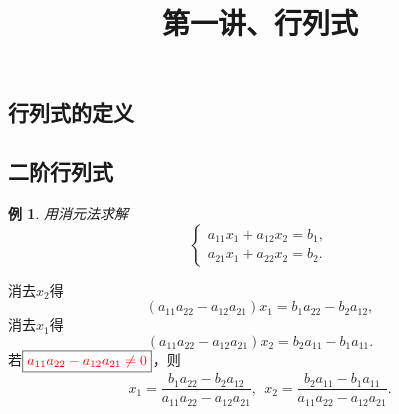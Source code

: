 \documentclass[10pt,a4paper%
tablecaptionabove]{article}
\renewcommand{\proofname}{\textbf{证明}}
\renewcommand{\figurename}{\textbf{图}}
\newcommand{\red}{\textcolor{red}}
\begin{document}
\begin{CJK}{UTF8}{gkai}
  \renewcommand{\proofname}{\textbf{证明}}
  \renewcommand{\figurename}{\textbf{图}}


  \newtheorem{li}{例}
  \newtheorem{jielun}{结论}
  \newtheorem{dingli}{定理}
  \newtheorem{mingti}{{命题}} 
  \newtheorem{yinli}{{引理}} 
  \newtheorem{tuilun}{{推论}}
  \newtheorem{dingyi}{{定义}} 
  \newtheorem{example}{{例}}
  \newtheorem*{example*}{{例}}
  \newtheorem*{jie}{{解}}
  \newtheorem*{zhengming}{{证明}}
  \newtheorem{zhu}{{注}}
  \newtheorem*{zhu*}{{注}}
  \newtheorem{xingzhi}{{性质}}
  \newtheorem{wenti}{{问题}}
  \newtheorem{rem}{{Remark}}
  \newtheorem{lem}{{Lemma}}
  \pagestyle{plain}


  \title{第一讲、行列式}
  \maketitle

  \section{行列式的定义}
  \subsection{二阶行列式}
  \begin{li}
    用消元法求解
    $$
    \left \lbrace
      \begin{array}{l}
        a_{11} x_1 + a_{12} x_2 = b_1, \\[0.2cm]
        a_{21} x_1 + a_{22} x_2 = b_2.
      \end{array}
    \right.
    $$
  \end{li}  
  消去$x_2$得
  $$
  (a_{11}a_{22}-a_{12}a_{21})x_1 = b_1 a_{22} - b_2 a_{12},
  $$
  消去$x_1$得
  $$
  (a_{11}a_{22}-a_{12}a_{21})x_2 = b_2 a_{11} - b_1 a_{11}.
  $$
  若$\boxed{\red{a_{11}a_{22}-a_{12}a_{21}\ne0}}$，则
  $$
  x_1 = \frac{b_1 a_{22} - b_2 a_{12}}{a_{11}a_{22}-a_{12}a_{21}}, \ \
  x_2 = \frac{b_2 a_{11} - b_1 a_{11}}{a_{11}a_{22}-a_{12}a_{21}}.
  $$


\end{CJK}
\end{document}
